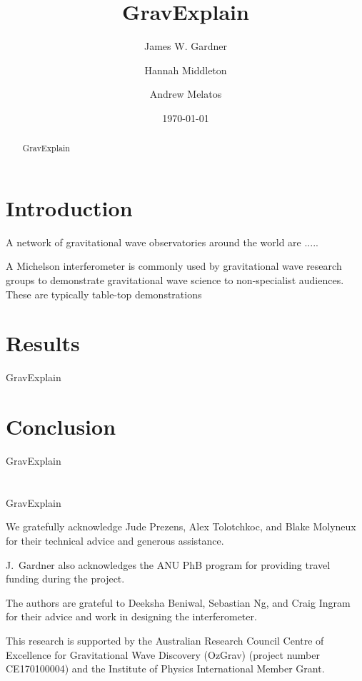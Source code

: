 \documentclass[prb,preprint]{revtex4-1}
\begin{document}
\title{GravExplain}

\author{James W. Gardner}

\author{Hannah Middleton}
\author{Andrew Melatos}

\date{\today}

\begin{abstract}
GravExplain

\end{abstract}

\maketitle

\section{Introduction}
A network of gravitational wave observatories around the world are .....

A Michelson interferometer is commonly used by gravitational wave research groups to demonstrate gravitational wave science to non-specialist audiences. 
These are typically table-top demonstrations 




\section{Results}
GravExplain


\section{Conclusion}
GravExplain


\appendix
\section{}
GravExplain


\begin{acknowledgments}
We gratefully acknowledge Jude Prezens, Alex Tolotchkoc, and Blake Molyneux for their technical advice and generous assistance.

J.~Gardner also acknowledges the ANU PhB program for providing travel funding during the project.

The authors are grateful to Deeksha Beniwal, Sebastian Ng, and Craig Ingram for their advice and work in designing the interferometer. 

This research is supported by the Australian Research Council Centre of Excellence for Gravitational Wave Discovery (OzGrav) (project number CE170100004) and the Institute of Physics International Member Grant.



\end{acknowledgments}
\end{document}
